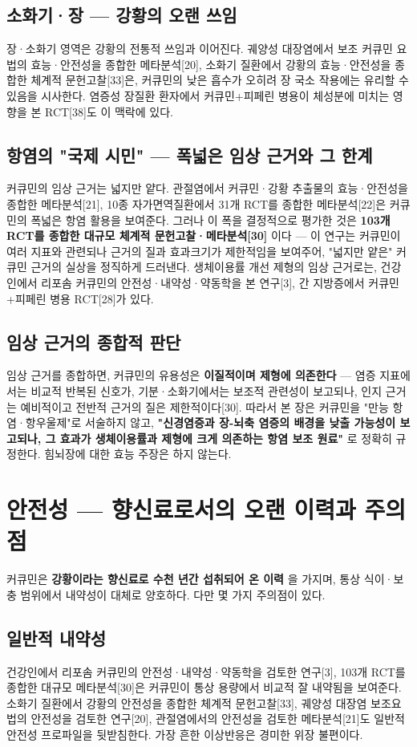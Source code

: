 \documentclass[11pt,oneside]{book}
\begin{document}
\subsection{소화기·장 — 강황의 오랜 쓰임}
장·소화기 영역은 강황의 전통적 쓰임과 이어진다. 궤양성 대장염에서 보조 커큐민 요법의 효능·안전성을 종합한 메타분석[20], 소화기 질환에서 강황의 효능·안전성을 종합한 체계적 문헌고찰[33]은, 커큐민의 낮은 흡수가 오히려 장 국소 작용에는 유리할 수 있음을 시사한다. 염증성 장질환 환자에서 커큐민+피페린 병용이 체성분에 미치는 영향을 본 RCT[38]도 이 맥락에 있다.

\subsection{항염의 "국제 시민" — 폭넓은 임상 근거와 그 한계}
커큐민의 임상 근거는 넓지만 얕다. 관절염에서 커큐민·강황 추출물의 효능·안전성을 종합한 메타분석[21], 10종 자가면역질환에서 31개 RCT를 종합한 메타분석[22]은 커큐민의 폭넓은 항염 활용을 보여준다. 그러나 이 폭을 결정적으로 평가한 것은 \textbf{103개 RCT를 종합한 대규모 체계적 문헌고찰·메타분석[30]} 이다 — 이 연구는 커큐민이 여러 지표와 관련되나 근거의 질과 효과크기가 제한적임을 보여주어, "넓지만 얕은" 커큐민 근거의 실상을 정직하게 드러낸다. 생체이용률 개선 제형의 임상 근거로는, 건강인에서 리포솜 커큐민의 안전성·내약성·약동학을 본 연구[3], 간 지방증에서 커큐민+피페린 병용 RCT[28]가 있다.

\subsection{임상 근거의 종합적 판단}
임상 근거를 종합하면, 커큐민의 유용성은 \textbf{이질적이며 제형에 의존한다} — 염증 지표에서는 비교적 반복된 신호가, 기분·소화기에서는 보조적 관련성이 보고되나, 인지 근거는 예비적이고 전반적 근거의 질은 제한적이다[30]. 따라서 본 장은 커큐민을 "만능 항염·항우울제"로 서술하지 않고, \textbf{"신경염증과 장-뇌축 염증의 배경을 낮출 가능성이 보고되나, 그 효과가 생체이용률과 제형에 크게 의존하는 항염 보조 원료"} 로 정확히 규정한다. 힘뇌장에 대한 효능 주장은 하지 않는다.

\section{안전성 — 향신료로서의 오랜 이력과 주의점}
커큐민은 \textbf{강황이라는 향신료로 수천 년간 섭취되어 온 이력} 을 가지며, 통상 식이·보충 범위에서 내약성이 대체로 양호하다. 다만 몇 가지 주의점이 있다.

\subsection{일반적 내약성}
건강인에서 리포솜 커큐민의 안전성·내약성·약동학을 검토한 연구[3], 103개 RCT를 종합한 대규모 메타분석[30]은 커큐민이 통상 용량에서 비교적 잘 내약됨을 보여준다. 소화기 질환에서 강황의 안전성을 종합한 체계적 문헌고찰[33], 궤양성 대장염 보조요법의 안전성을 검토한 연구[20], 관절염에서의 안전성을 검토한 메타분석[21]도 일반적 안전성 프로파일을 뒷받침한다. 가장 흔한 이상반응은 경미한 위장 불편이다.
\end{document}
